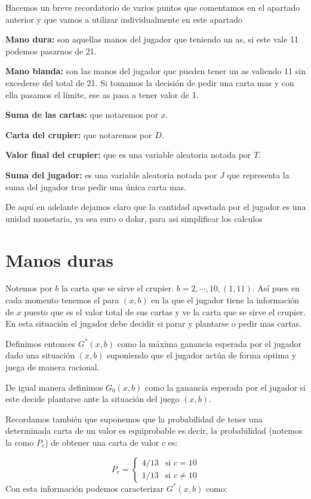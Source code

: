 \documentclass[12pt,a4paper,]{book}
\numberwithin{dummy}{section}
\theoremstyle{ocrenumbox}
\theoremstyle{blacknumex}
\theoremstyle{blacknumbox}
\theoremstyle{ocrenum}
\theoremstyle{ocrenum}
\begin{document}
Hacemos un breve recordatorio de varios puntos que comentamos en el
apartado anterior y que vamos a utilizar individualmente en este
apartado

\textbf{Mano dura:} son aquellas manos del jugador que teniendo un as,
si este vale 11 podemos pasarnos de 21.

\textbf{Mano blanda:} son las manos del jugador que pueden tener un as
valiendo 11 sin excederse del total de 21. Si tomamos la decisión de
pedir una carta mas y con ella pasamos el límite, ese as pasa a tener
valor de 1.

\textbf{Suma de las cartas:} que notaremos por \(x\).

\textbf{Carta del crupier:} que notaremos por \(D\).

\textbf{Valor final del crupier:} que es una variable aleatoria notada
por \(T\).

\textbf{Suma del jugador:} es una variable aleatoria notada por \(J\)
que representa la suma del jugador tras pedir una única carta mas.

De aquí en adelante dejamos claro que la cantidad apostada por el
jugador es una unidad monetaria, ya sea euro o dolar, para asi
simplificar los calculos

\hypertarget{Seccion41}{%
\section{Manos duras}\label{Seccion41}}

Notemos por \(b\) la carta que se sirve el crupier.
\(b = 2, \cdots, 10, (1,11)\). Así pues en cada momento tenemos el para
\((x,b)\) en la que el jugador tiene la información de \(x\) puesto que
es el valor total de sus cartas y ve la carta que se sirve el crupier.
En esta situación el jugador debe decidir si parar y plantarse o pedir
mas cartas.

Definimos entonces \(G^*(x,b)\) como la máxima ganancia esperada por el
jugador dado una situación \((x,b)\) suponiendo que el jugador actúa de
forma optima y juega de manera racional.

De igual manera definimos \(G_0(x,b)\) como la ganancia esperada por el
jugador si este decide plantarse ante la situación del juego \((x,b)\).

Recordamos también que suponemos que la probabilidad de tener una
determinada carta de un valor es equiprobable es decir, la probabilidad
(notemos la como \(P_c\)) de obtener una carta de valor \(c\) es:

\[
P_c = 
\begin{cases}
4/13 & \text{si } c=10 \\
1/13 & \text{si } c \neq 10
\end{cases}
\] Con esta información podemos caracterizar \(G^*(x,b)\) como:
\end{document}
